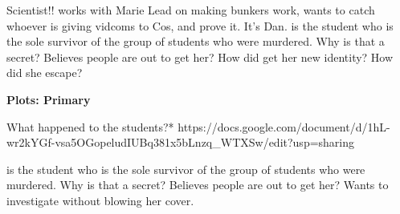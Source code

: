 \documentclass[char]{GL2020}
\begin{document}
\name{\cAssistantScientist{}}








Scientist!!
works with Marie
Lead on making bunkers work, wants to catch whoever is giving vidcoms to Cos, and prove it.  It's Dan.
\cAssistantScientist{} is the student who is the sole survivor of the group of students who were murdered.  Why is that a secret?  Believes people are out to get her?  How did \cAssistantScientist{} get her new identity?  How did she escape?

\textbf{Plots: Primary}

What happened to the students?*
https://docs.google.com/document/d/1hL-wr2kYGf-vsa5OGopeludIUBq381x5bLnzq_WTXSw/edit?usp=sharing

\cAssistantScientist{} is the student who is the sole survivor of the group of students who were murdered.  Why is that a secret?  Believes people are out to get her?  Wants to investigate without blowing her cover.
\end{document}
